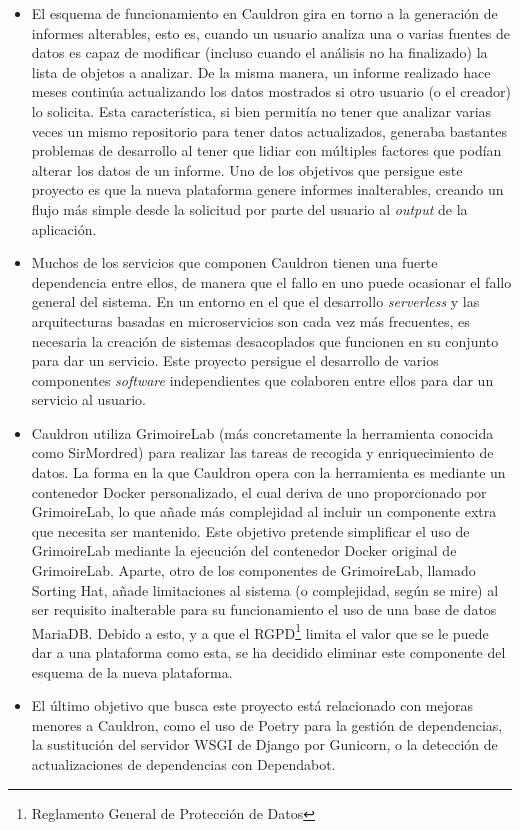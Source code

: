 \begin{itemize}
    \item El esquema de funcionamiento en Cauldron gira en torno a la generación de informes alterables, esto es, cuando un usuario analiza una o varias fuentes de datos es capaz de modificar (incluso cuando el análisis no ha finalizado) la lista de objetos a analizar. De la misma manera, un informe realizado hace meses continúa actualizando los datos mostrados si otro usuario (o el creador) lo solicita. Esta característica, si bien permitía no tener que analizar varias veces un mismo repositorio para tener datos actualizados, generaba bastantes problemas de desarrollo al tener que lidiar con múltiples factores que podían alterar los datos de un informe. Uno de los objetivos que persigue este proyecto es que la nueva plataforma genere informes inalterables, creando un flujo más simple desde la solicitud por parte del usuario al \emph{output} de la aplicación.
    \item Muchos de los servicios que componen Cauldron tienen una fuerte dependencia entre ellos, de manera que el fallo en uno puede ocasionar el fallo general del sistema. En un entorno en el que el desarrollo \emph{serverless} y las arquitecturas basadas en microservicios son cada vez más frecuentes, es necesaria la creación de sistemas desacoplados que funcionen en su conjunto para dar un servicio. Este proyecto persigue el desarrollo de varios componentes \emph{software} independientes que colaboren entre ellos para dar un servicio al usuario.
    \item Cauldron utiliza GrimoireLab (más concretamente la herramienta conocida como SirMordred) para realizar las tareas de recogida y enriquecimiento de datos. La forma en la que Cauldron opera con la herramienta es mediante un contenedor Docker personalizado, el cual deriva de uno proporcionado por GrimoireLab, lo que añade más complejidad al incluir un componente extra que necesita ser mantenido. Este objetivo pretende simplificar el uso de GrimoireLab mediante la ejecución del contenedor Docker original de GrimoireLab. Aparte, otro de los componentes de GrimoireLab, llamado Sorting Hat, añade limitaciones al sistema (o complejidad, según se mire) al ser requisito inalterable para su funcionamiento el uso de una base de datos MariaDB. Debido a esto, y a que el RGPD\footnote{Reglamento General de Protección de Datos} limita el valor que se le puede dar a una plataforma como esta, se ha decidido eliminar este componente del esquema de la nueva plataforma.
    \item El último objetivo que busca este proyecto está relacionado con mejoras menores a Cauldron, como el uso de Poetry para la gestión de dependencias, la sustitución del servidor WSGI de Django por Gunicorn, o la detección de actualizaciones de dependencias con Dependabot.
\end{itemize}
